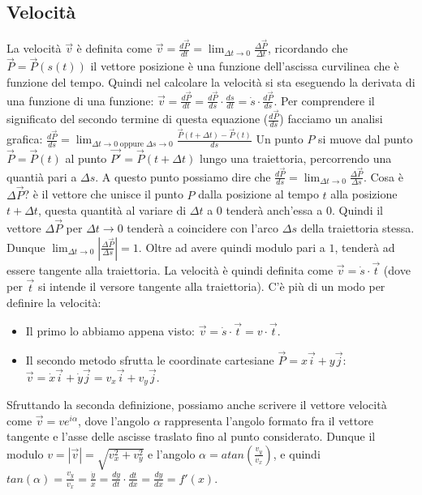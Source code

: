 \subsection{Velocità}
La velocità $\vec{v}$ è definita come $\vec{v} = \frac{d \vec{P}}{dt} = \lim_{\Delta t\rightarrow 0} \frac{\Delta \vec{P}}{\Delta t}$, ricordando che $\vec{P} = \vec{P}(s(t))$ il vettore posizione è una funzione dell'ascissa curvilinea che è funzione del tempo. Quindi nel calcolare la velocità si sta eseguendo la derivata di una funzione di una funzione: $\vec{v} = \frac{d \vec{P}}{dt} = \frac{d \vec{P}}{ds} \cdot \frac{ds}{dt} = \dot{s} \cdot  \frac{d \vec{P}}{ds}$. Per comprendere il significato del secondo termine di questa equazione ($\frac{d \vec{P}}{ds}$) facciamo un analisi grafica:
$\frac{d \vec{P}}{ds} = \lim_{\Delta t\rightarrow 0 \;\text{oppure}\; \Delta s \rightarrow 0}\frac{\vec{P}(t+\Delta t) - \vec{P}(t)}{ds}$\newline
Un punto $P$ si muove dal punto $\vec{P} = \vec{P}(t)$ al punto $\vec{P'} = \vec{P} (t + \Delta t)$ lungo una traiettoria, percorrendo una quantià pari a $\Delta s$. A questo punto possiamo dire che $\frac{d\vec{P}}{ds} = \lim_{\Delta t\rightarrow 0} \frac{\Delta \vec{P}}{\Delta s}$. Cosa è $\Delta \vec{P}$? è il vettore che unisce il punto $P$ dalla posizione al tempo $t$ alla posizione $t + \Delta t$, questa quantità al variare di $\Delta t$ a $0$ tenderà anch'essa a $0$. Quindi il vettore $\Delta \vec{P}$ per $\Delta t \rightarrow 0$ tenderà a coincidere con l'arco $\Delta s$ della traiettoria stessa. Dunque $\lim_{\Delta t\rightarrow 0} \left|\frac{\Delta \vec{P}}{\Delta s}\right| = 1$. Oltre ad avere quindi modulo pari a $1$, tenderà ad essere tangente alla traiettoria.\newline
La velocità è quindi definita come $\vec{v} = \dot{s} \cdot \vec{t}$ (dove per $\vec{t}$ si intende il versore tangente alla traiettoria).\newline
C'è più di un modo per definire la velocità:
\begin{itemize}
    \item Il primo lo abbiamo appena visto: $\vec{v} = \dot{s} \cdot \vec{t} = v \cdot \vec{t}$.
    \item Il secondo metodo sfrutta le coordinate cartesiane $\vec{P} = x \vec{i} + y \vec{j}$: $\vec{v} = \dot{x} \vec{i} + \dot{y} \vec{j} = v_x \vec{i} + v_y \vec{j}$.
\end{itemize}
Sfruttando la seconda definizione, possiamo anche scrivere il vettore velocità come $\vec{v} = v e^{i \alpha}$, dove l'angolo $\alpha$ rappresenta l'angolo formato fra il vettore tangente e l'asse delle ascisse traslato fino al punto considerato. Dunque il modulo $v = |\vec{v}| = \sqrt{v_x^2 +v_y^2}$ e l'angolo $\alpha = atan\left(\frac{v_y}{v_x}\right)$, e quindi $tan(\alpha) = \frac{v_y}{v_x} = \frac{\dot{y}}{\dot{x}} = \frac{dy}{dt} \cdot \frac{dt}{dx} = \frac{dy}{dx} = f'(x)$.
